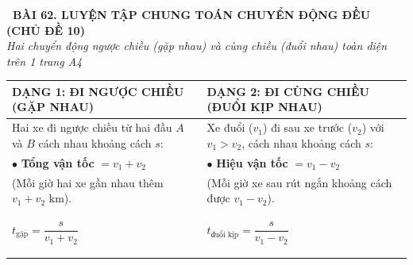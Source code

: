 \documentclass[14pt,a4paper,oneside]{extbook}
\begin{document}
\noindent
\begin{tcolorbox}[
  enhanced,
  colback=teal!8!white,
  colframe=teal!80!black,
  arc=3mm,
  boxrule=1.1pt,
  width=\linewidth,
  halign=center,
  top=2.2mm, bottom=2.2mm,
  left=3mm, right=3mm,
  drop fuzzy shadow
]
  {\large\bfseries\color{teal!95!black}\faBookmark\ BÀI 62. LUYỆN TẬP CHUNG TOÁN CHUYỂN ĐỘNG ĐỀU (CHỦ ĐỀ 10)}\\[2pt]
  {\scriptsize\color{black!75}\itshape Hai chuyển động ngược chiều (gặp nhau) và cùng chiều (đuổi nhau) toàn diện trên 1 trang A4}
\end{tcolorbox}

\vspace{3.2mm}
\noindent
\begin{tcolorbox}[
  enhanced,
  title={\footnotesize\bfseries\color{white}\faExchange\ 1. Hai bài toán chuyển động cùng lúc kinh điển},
  colback=blue!2!white,
  colframe=blue!75!black,
  arc=2.5mm, boxrule=0.8pt, top=1.8mm, bottom=1.8mm, left=2.5mm, right=2.5mm
]
  \footnotesize
  \begin{tabular}{p{}|p{}}
    \textbf{DẠNG 1: ĐI NGƯỢC CHIỀU (GẶP NHAU)} & \textbf{DẠNG 2: ĐI CÙNG CHIỀU (ĐUỔI KỊP NHAU)} \\ \hline
    Hai xe đi ngược chiều từ hai đầu $A$ và $B$ cách nhau khoảng cách $s$: & Xe đuổi ($v_1$) đi sau xe trước ($v_2$) với $v_1 > v_2$, cách nhau khoảng cách $s$: \\
    $\bullet$ \textbf{Tổng vận tốc} $= v_1 + v_2$ & $\bullet$ \textbf{Hiệu vận tốc} $= v_1 - v_2$ \\
    (Mỗi giờ hai xe gần nhau thêm $v_1 + v_2\text{ km}$). & (Mỗi giờ xe sau rút ngắn khoảng cách được $v_1 - v_2$). \\
    \begin{tcolorbox}[colback=white, colframe=blue!75!black, boxrule=0.5pt, arc=1.5mm, halign=center, top=1mm, bottom=1mm]
      {\scriptsize\bfseries\color{blue!90!black}$t_{\text{gặp}} = \dfrac{s}{v_1 + v_2}$}
    \end{tcolorbox} &
    \begin{tcolorbox}[colback=white, colframe=purple!70!black, boxrule=0.5pt, arc=1.5mm, halign=center, top=1mm, bottom=1mm]
      {\scriptsize\bfseries\color{purple!90!black}$t_{\text{đuổi kịp}} = \dfrac{s}{v_1 - v_2}$}
    \end{tcolorbox}
  \end{tabular}
\end{tcolorbox}
\end{document}
